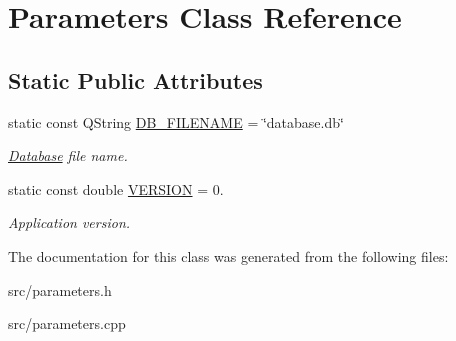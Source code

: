 \hypertarget{classParameters}{\section{Parameters Class Reference}
\label{classParameters}
}
\subsection*{Static Public Attributes}
\begin{DoxyCompactItemize}
\item 
\hypertarget{classParameters_a80b98bd51d910bcc2203afcacbc7df87}{static const Q\+String \hyperlink{classParameters_a80b98bd51d910bcc2203afcacbc7df87}{D\+B\+\_\+\+F\+I\+L\+E\+N\+A\+M\+E} = \char`\"{}database.\+db\char`\"{}}\label{classParameters_a80b98bd51d910bcc2203afcacbc7df87}

\begin{DoxyCompactList}\small\item\em \hyperlink{classDatabase}{Database} file name. \end{DoxyCompactList}\item 
\hypertarget{classParameters_a279ee24140c761de46178daa8960bdc8}{static const double \hyperlink{classParameters_a279ee24140c761de46178daa8960bdc8}{V\+E\+R\+S\+I\+O\+N} = 0.}\label{classParameters_a279ee24140c761de46178daa8960bdc8}

\begin{DoxyCompactList}\small\item\em Application version. \end{DoxyCompactList}\end{DoxyCompactItemize}


The documentation for this class was generated from the following files\+:\begin{DoxyCompactItemize}
\item 
src/parameters.\+h\item 
src/parameters.\+cpp\end{DoxyCompactItemize}
